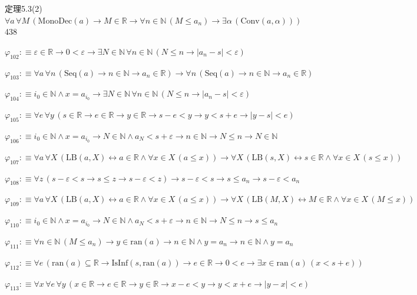 \begin{fullproof}{定理5.3(2)}{$\forall a\,\forall M\,(\mathrm{MonoDec}(a) \to M \in \mathbb{R} \to \forall n \in \mathbb{N}\,(M \leq a_{n}) \to \exists \alpha\,(\mathrm{Conv}(a,\alpha)))$}{438}
\begin{abbrevlist}
\item $\varphi_{102} :\equiv \varepsilon \in \mathbb{R} \to 0 < \varepsilon \to \exists N \in \mathbb{N}\,\forall n \in \mathbb{N}\,(N \leq n \to \lvert a_{n} - s \rvert < \varepsilon)$
\item $\varphi_{103} :\equiv \forall a\,\forall n\,(\mathrm{Seq}(a) \to n \in \mathbb{N} \to a_{n} \in \mathbb{R}) \to \forall n\,(\mathrm{Seq}(a) \to n \in \mathbb{N} \to a_{n} \in \mathbb{R})$
\item $\varphi_{104} :\equiv i_{0} \in \mathbb{N} \land x = a_{i_{0}} \to \exists N \in \mathbb{N}\,\forall n \in \mathbb{N}\,(N \leq n \to \lvert a_{n} - s \rvert < \varepsilon)$
\item $\varphi_{105} :\equiv \forall e\,\forall y\,(s \in \mathbb{R} \to e \in \mathbb{R} \to y \in \mathbb{R} \to s - e < y \to y < s + e \to \lvert y - s \rvert < e)$
\item $\varphi_{106} :\equiv i_{0} \in \mathbb{N} \land x = a_{i_{0}} \to N \in \mathbb{N} \land a_{N} < s + \varepsilon \to n \in \mathbb{N} \to N \leq n \to N \in \mathbb{N}$
\item $\varphi_{107} :\equiv \forall a\,\forall X\,(\mathrm{LB}(a,X) \leftrightarrow a \in \mathbb{R} \land \forall x \in X\,(a \leq x)) \to \forall X\,(\mathrm{LB}(s,X) \leftrightarrow s \in \mathbb{R} \land \forall x \in X\,(s \leq x))$
\item $\varphi_{108} :\equiv \forall z\,(s - \varepsilon < s \to s \leq z \to s - \varepsilon < z) \to s - \varepsilon < s \to s \leq a_{n} \to s - \varepsilon < a_{n}$
\item $\varphi_{109} :\equiv \forall a\,\forall X\,(\mathrm{LB}(a,X) \leftrightarrow a \in \mathbb{R} \land \forall x \in X\,(a \leq x)) \to \forall X\,(\mathrm{LB}(M,X) \leftrightarrow M \in \mathbb{R} \land \forall x \in X\,(M \leq x))$
\item $\varphi_{110} :\equiv i_{0} \in \mathbb{N} \land x = a_{i_{0}} \to N \in \mathbb{N} \land a_{N} < s + \varepsilon \to n \in \mathbb{N} \to N \leq n \to s \leq a_{n}$
\item $\varphi_{111} :\equiv \forall n \in \mathbb{N}\,(M \leq a_{n}) \to y \in \mathrm{ran}(a) \to n \in \mathbb{N} \land y = a_{n} \to n \in \mathbb{N} \land y = a_{n}$
\item $\varphi_{112} :\equiv \forall e\,(\mathrm{ran}(a) \subseteq \mathbb{R} \to \mathrm{IsInf}(s,\mathrm{ran}(a)) \to e \in \mathbb{R} \to 0 < e \to \exists x \in \mathrm{ran}(a)\,(x < s + e))$
\item $\varphi_{113} :\equiv \forall x\,\forall e\,\forall y\,(x \in \mathbb{R} \to e \in \mathbb{R} \to y \in \mathbb{R} \to x - e < y \to y < x + e \to \lvert y - x \rvert < e)$

\end{abbrevlist}
\end{fullproof}

